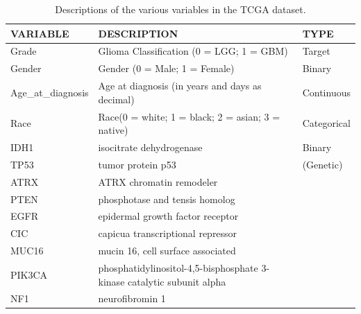 \documentclass[12pt]{article}
\newtheorem{Proof of Lemma}{Proof of Lemma}
\begin{document}
\begin{table}[h!]
\centering
\caption{Descriptions of the various variables in the TCGA dataset.}
\label{tab:sample_table}
\begin{tabular}{|p{3.5cm}|p{11cm}|p{2cm}|}
  \hline
  \textbf{VARIABLE}         & \textbf{DESCRIPTION} & \textbf{TYPE} \\ \hline
  Grade                     & Glioma Classification (0 = LGG; 1 = GBM)                                                          & Target            \\ \hline 
  Gender                    & Gender (0 = Male; 1 = Female)                                                                     & Binary           \\
  Age\_at\_diagnosis        & Age at diagnosis (in years and days as decimal)                                                   & Continuous       \\
  Race                      & Race\footnotemark(0 = white; 1 = black; 2 = asian; 3 = native)                                    & Categorical      \\ \hline
  IDH1                      & isocitrate dehydrogenase                                                                          & Binary          \\ 
  TP53                      & tumor protein p53                                                                                 & (Genetic\footnotemark)   \\
  ATRX                      & ATRX chromatin remodeler                                                                          & \\
  PTEN                      & phosphotase and tensis homolog                                                                    & \\
  EGFR                      & epidermal growth factor receptor                                                                  & \\
  CIC                       & capicua transcriptional repressor                                                                 & \\
  MUC16                     & mucin 16, cell surface associated                                                                 & \\
  PIK3CA                    & phosphatidylinositol-4,5-bisphosphate 3-kinase catalytic subunit alpha                            & \\
  NF1                       & neurofibromin 1                                                                                   & \\

\end{tabular}
\end{table}
\end{document}
